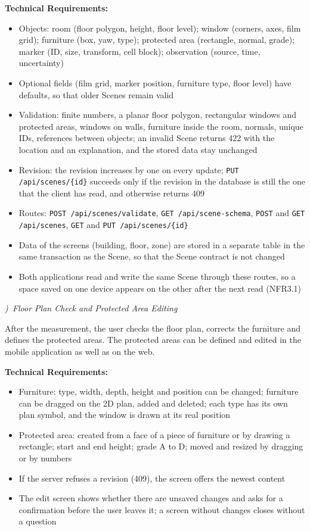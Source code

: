 \documentclass[conference]{IEEEtran}
\newcommand{\subsubhead}[1]{\par\noindent\refstepcounter{subsubsection}%
{\normalfont\normalsize\itshape\arabic{subsubsection})\ #1}\par\nopagebreak}
\newcommand{\TR}{\par\noindent\textbf{Technical Requirements:}\par\nopagebreak}
\begin{document}
\TR
\begin{itemize}
\item Objects: room (floor polygon, height, floor level); window (corners, axes, film grid); furniture (box, yaw, type); protected area (rectangle, normal, grade); marker (ID, size, transform, cell block); observation (source, time, uncertainty)
\item Optional fields (film grid, marker position, furniture type, floor level) have defaults, so that older Scenes remain valid
\item Validation: finite numbers, a planar floor polygon, rectangular windows and protected areas, windows on walls, furniture inside the room, normals, unique IDs, references between objects; an invalid Scene returns 422 with the location and an explanation, and the stored data stay unchanged
\item Revision: the revision increases by one on every update; \texttt{PUT /api/scenes/\allowbreak\{id\}} succeeds only if the revision in the database is still the one that the client has read, and otherwise returns 409
\item Routes: \texttt{POST /api/scenes/\allowbreak validate}, \texttt{GET /api/\allowbreak scene-schema}, \texttt{POST} and \texttt{GET /api/scenes}, \texttt{GET} and \texttt{PUT /api/scenes/\allowbreak\{id\}}
\item Data of the screens (building, floor, zone) are stored in a separate table in the same transaction as the Scene, so that the Scene contract is not changed
\item Both applications read and write the same Scene through these routes, so a space saved on one device appears on the other after the next read (NFR3.1)
\end{itemize}

\subsubhead{Floor Plan Check and Protected Area Editing}
\noindent\hspace*{\parindent}After the measurement, the user checks the floor plan, corrects the furniture and defines the protected areas. The protected areas can be defined and edited in the mobile application as well as on the web.

\TR
\begin{itemize}
\item Furniture: type, width, depth, height and position can be changed; furniture can be dragged on the 2D plan, added and deleted; each type has its own plan symbol, and the window is drawn at its real position
\item Protected area: created from a face of a piece of furniture or by drawing a rectangle; start and end height; grade A to D; moved and resized by dragging or by numbers
\item If the server refuses a revision (409), the screen offers the newest content
\item The edit screen shows whether there are unsaved changes and asks for a confirmation before the user leaves it; a screen without changes closes without a question
\end{itemize}
\end{document}
